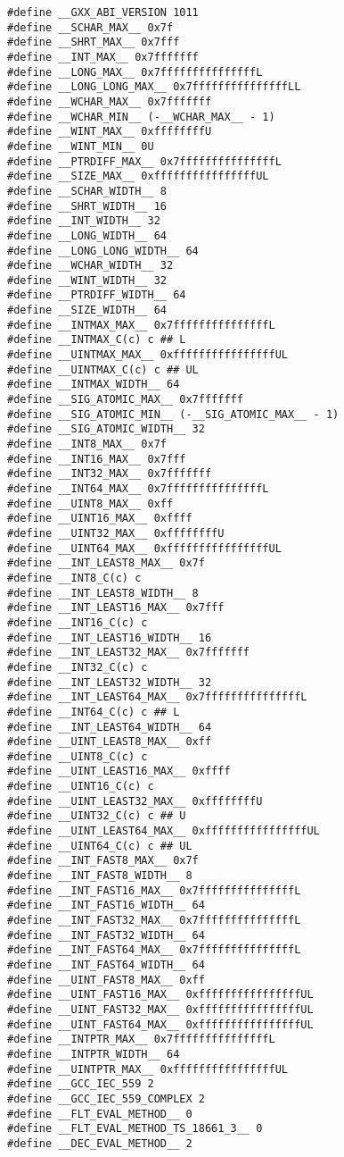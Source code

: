 \documentclass[11pt]{article}
\begin{document}
\begin{enumerate}
\begin{verbatim}
#define __GXX_ABI_VERSION 1011
#define __SCHAR_MAX__ 0x7f
#define __SHRT_MAX__ 0x7fff
#define __INT_MAX__ 0x7fffffff
#define __LONG_MAX__ 0x7fffffffffffffffL
#define __LONG_LONG_MAX__ 0x7fffffffffffffffLL
#define __WCHAR_MAX__ 0x7fffffff
#define __WCHAR_MIN__ (-__WCHAR_MAX__ - 1)
#define __WINT_MAX__ 0xffffffffU
#define __WINT_MIN__ 0U
#define __PTRDIFF_MAX__ 0x7fffffffffffffffL
#define __SIZE_MAX__ 0xffffffffffffffffUL
#define __SCHAR_WIDTH__ 8
#define __SHRT_WIDTH__ 16
#define __INT_WIDTH__ 32
#define __LONG_WIDTH__ 64
#define __LONG_LONG_WIDTH__ 64
#define __WCHAR_WIDTH__ 32
#define __WINT_WIDTH__ 32
#define __PTRDIFF_WIDTH__ 64
#define __SIZE_WIDTH__ 64
#define __INTMAX_MAX__ 0x7fffffffffffffffL
#define __INTMAX_C(c) c ## L
#define __UINTMAX_MAX__ 0xffffffffffffffffUL
#define __UINTMAX_C(c) c ## UL
#define __INTMAX_WIDTH__ 64
#define __SIG_ATOMIC_MAX__ 0x7fffffff
#define __SIG_ATOMIC_MIN__ (-__SIG_ATOMIC_MAX__ - 1)
#define __SIG_ATOMIC_WIDTH__ 32
#define __INT8_MAX__ 0x7f
#define __INT16_MAX__ 0x7fff
#define __INT32_MAX__ 0x7fffffff
#define __INT64_MAX__ 0x7fffffffffffffffL
#define __UINT8_MAX__ 0xff
#define __UINT16_MAX__ 0xffff
#define __UINT32_MAX__ 0xffffffffU
#define __UINT64_MAX__ 0xffffffffffffffffUL
#define __INT_LEAST8_MAX__ 0x7f
#define __INT8_C(c) c
#define __INT_LEAST8_WIDTH__ 8
#define __INT_LEAST16_MAX__ 0x7fff
#define __INT16_C(c) c
#define __INT_LEAST16_WIDTH__ 16
#define __INT_LEAST32_MAX__ 0x7fffffff
#define __INT32_C(c) c
#define __INT_LEAST32_WIDTH__ 32
#define __INT_LEAST64_MAX__ 0x7fffffffffffffffL
#define __INT64_C(c) c ## L
#define __INT_LEAST64_WIDTH__ 64
#define __UINT_LEAST8_MAX__ 0xff
#define __UINT8_C(c) c
#define __UINT_LEAST16_MAX__ 0xffff
#define __UINT16_C(c) c
#define __UINT_LEAST32_MAX__ 0xffffffffU
#define __UINT32_C(c) c ## U
#define __UINT_LEAST64_MAX__ 0xffffffffffffffffUL
#define __UINT64_C(c) c ## UL
#define __INT_FAST8_MAX__ 0x7f
#define __INT_FAST8_WIDTH__ 8
#define __INT_FAST16_MAX__ 0x7fffffffffffffffL
#define __INT_FAST16_WIDTH__ 64
#define __INT_FAST32_MAX__ 0x7fffffffffffffffL
#define __INT_FAST32_WIDTH__ 64
#define __INT_FAST64_MAX__ 0x7fffffffffffffffL
#define __INT_FAST64_WIDTH__ 64
#define __UINT_FAST8_MAX__ 0xff
#define __UINT_FAST16_MAX__ 0xffffffffffffffffUL
#define __UINT_FAST32_MAX__ 0xffffffffffffffffUL
#define __UINT_FAST64_MAX__ 0xffffffffffffffffUL
#define __INTPTR_MAX__ 0x7fffffffffffffffL
#define __INTPTR_WIDTH__ 64
#define __UINTPTR_MAX__ 0xffffffffffffffffUL
#define __GCC_IEC_559 2
#define __GCC_IEC_559_COMPLEX 2
#define __FLT_EVAL_METHOD__ 0
#define __FLT_EVAL_METHOD_TS_18661_3__ 0
#define __DEC_EVAL_METHOD__ 2

\end{verbatim}
\end{enumerate}
\end{document}
